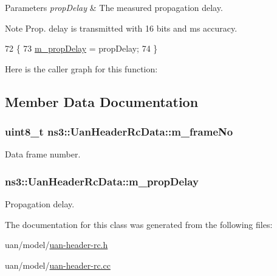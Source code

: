 \begin{DoxyParams}{Parameters}
{\em prop\+Delay} & The measured propagation delay. \\
\hline
\end{DoxyParams}
\begin{DoxyNote}{Note}
Prop. delay is transmitted with 16 bits and ms accuracy. 
\end{DoxyNote}

\begin{DoxyCode}
72 \{
73   \hyperlink{classns3_1_1UanHeaderRcData_a2064d62489ffb5549897e06f171f8f68}{m\_propDelay} = propDelay;
74 \}
\end{DoxyCode}


Here is the caller graph for this function\+:




\subsection{Member Data Documentation}
\subsubsection[{\texorpdfstring{m\+\_\+frame\+No}{m_frameNo}}]{\setlength{\rightskip}{0pt plus 5cm}uint8\+\_\+t ns3\+::\+Uan\+Header\+Rc\+Data\+::m\+\_\+frame\+No\hspace{0.3cm}{\ttfamily [private]}}\hypertarget{classns3_1_1UanHeaderRcData_a44293983565792b02d4ea8b16e565e93}{}\label{classns3_1_1UanHeaderRcData_a44293983565792b02d4ea8b16e565e93}


Data frame number. 

\subsubsection[{\texorpdfstring{m\+\_\+prop\+Delay}{m_propDelay}}]{ ns3\+::\+Uan\+Header\+Rc\+Data\+::m\+\_\+prop\+Delay\hspace{0.3cm}{\ttfamily [private]}}\hypertarget{classns3_1_1UanHeaderRcData_a2064d62489ffb5549897e06f171f8f68}{}\label{classns3_1_1UanHeaderRcData_a2064d62489ffb5549897e06f171f8f68}


Propagation delay. 



The documentation for this class was generated from the following files\+:\begin{DoxyCompactItemize}
\item 
uan/model/\hyperlink{uan-header-rc_8h}{uan-\/header-\/rc.\+h}\item 
uan/model/\hyperlink{uan-header-rc_8cc}{uan-\/header-\/rc.\+cc}\end{DoxyCompactItemize}
